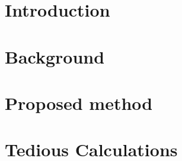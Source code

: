 \documentclass[12pt]{article}
\begin{document}
\def\by{\bm{y}} %
\def\bY{\bm{Y}} %

\def\bz{\bm{z}} %
\def\bmu{\boldsymbol{\mu}}
\def\br{\bm{r}}

\def\rk{\text{rk}} %
\def\nx{\texttt{nx}}

\def\bphi{\boldsymbol{\varphi}}
\def\bbeta{\boldsymbol{\beta}}

\def\Ecal{\mathcal{E}}
\def\R{\mathbb{R}}
\def\N{\mathcal{N}}
\def\P{\mathbb{P}}


\section{Introduction}



\section{Background}


\section{Proposed method}


\newpage


\newpage
\appendix
\section{Tedious Calculations}

\end{document}
